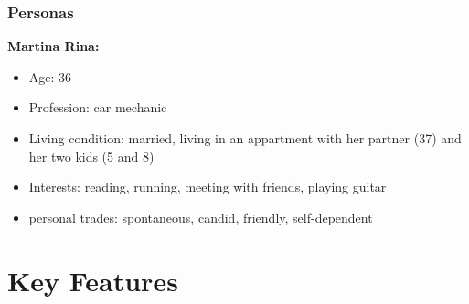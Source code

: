 \documentclass[aspectratio=169]{beamer}
\begin{document}
\begin{frame}   
	\frametitle{Personas}{\textbf{Martina Rina:}}


	\begin{itemize}
		\item Age: 36
		\item Profession: car mechanic
		\item Living condition: married, living in an appartment with her partner (37) and her two kids (5 and 8)
		\item Interests: reading, running, meeting with friends, playing guitar 
		\item personal trades: spontaneous, candid, friendly, self-dependent
	\end{itemize}


\end{frame}

\section{Key Features}


\end{document}
